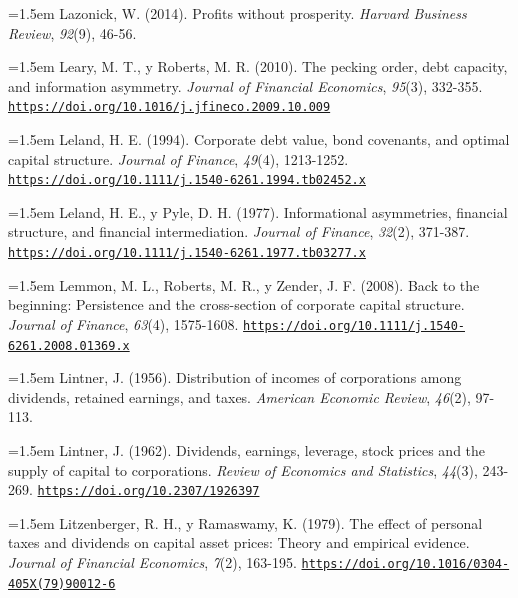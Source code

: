 \documentclass[10pt,a4paper]{article}
\begin{document}
\noindent\hangindent=1.5em Lazonick, W. (2014). Profits without prosperity. \textit{Harvard Business Review}, \textit{92}(9), 46-56.

\noindent\hangindent=1.5em Leary, M. T., y Roberts, M. R. (2010). The pecking order, debt capacity, and information asymmetry. \textit{Journal of Financial Economics}, \textit{95}(3), 332-355. \href{https://doi.org/10.1016/j.jfineco.2009.10.009}{\nolinkurl{https://doi.org/10.1016/j.jfineco.2009.10.009}}

\noindent\hangindent=1.5em Leland, H. E. (1994). Corporate debt value, bond covenants, and optimal capital structure. \textit{Journal of Finance}, \textit{49}(4), 1213-1252. \href{https://doi.org/10.1111/j.1540-6261.1994.tb02452.x}{\nolinkurl{https://doi.org/10.1111/j.1540-6261.1994.tb02452.x}}

\noindent\hangindent=1.5em Leland, H. E., y Pyle, D. H. (1977). Informational asymmetries, financial structure, and financial intermediation. \textit{Journal of Finance}, \textit{32}(2), 371-387. \href{https://doi.org/10.1111/j.1540-6261.1977.tb03277.x}{\nolinkurl{https://doi.org/10.1111/j.1540-6261.1977.tb03277.x}}

\noindent\hangindent=1.5em Lemmon, M. L., Roberts, M. R., y Zender, J. F. (2008). Back to the beginning: Persistence and the cross-section of corporate capital structure. \textit{Journal of Finance}, \textit{63}(4), 1575-1608. \href{https://doi.org/10.1111/j.1540-6261.2008.01369.x}{\nolinkurl{https://doi.org/10.1111/j.1540-6261.2008.01369.x}}

\noindent\hangindent=1.5em Lintner, J. (1956). Distribution of incomes of corporations among dividends, retained earnings, and taxes. \textit{American Economic Review}, \textit{46}(2), 97-113.

\noindent\hangindent=1.5em Lintner, J. (1962). Dividends, earnings, leverage, stock prices and the supply of capital to corporations. \textit{Review of Economics and Statistics}, \textit{44}(3), 243-269. \href{https://doi.org/10.2307/1926397}{\nolinkurl{https://doi.org/10.2307/1926397}}

\noindent\hangindent=1.5em Litzenberger, R. H., y Ramaswamy, K. (1979). The effect of personal taxes and dividends on capital asset prices: Theory and empirical evidence. \textit{Journal of Financial Economics}, \textit{7}(2), 163-195. \href{https://doi.org/10.1016/0304-405X(79)90012-6}{\nolinkurl{https://doi.org/10.1016/0304-405X(79)90012-6}}
\end{document}

